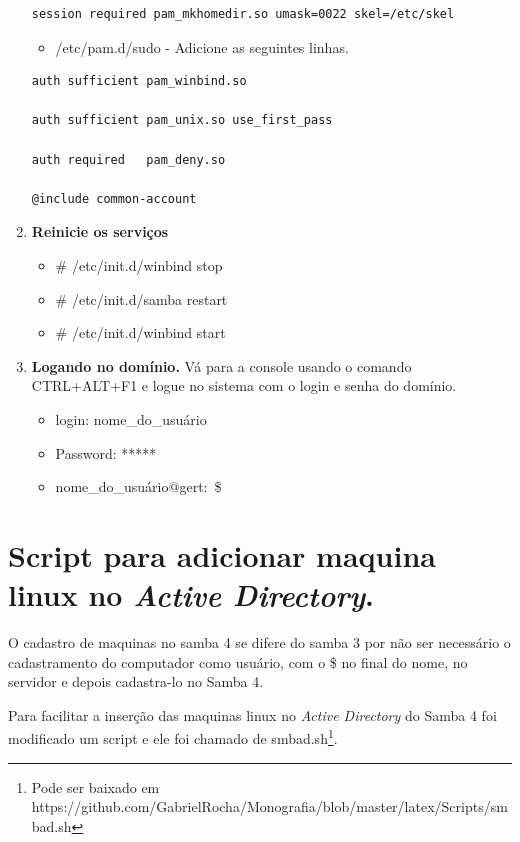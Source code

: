 \begin{enumerate}
\begin{lstlisting}
session required pam_mkhomedir.so umask=0022 skel=/etc/skel
		\end{lstlisting}

		\begin{itemize}
			\item {/etc/pam.d/sudo} - Adicione as seguintes linhas.\\
		\end{itemize}

		\begin{lstlisting}
auth sufficient pam_winbind.so

auth sufficient pam_unix.so use_first_pass

auth required   pam_deny.so

@include common-account
		\end{lstlisting}

	\item \textbf{Reinicie os serviços}
		\begin{itemize}
			\item \# /etc/init.d/winbind stop
			\item \# /etc/init.d/samba restart		
			\item \# /etc/init.d/winbind start
		\end{itemize}

	\item \textbf{Logando no domínio.}
		Vá para a console usando o comando CTRL+ALT+F1 e logue no sistema com o login e senha do domínio.

		\begin{itemize}
			\item {login: nome\_do\_usuário}
			\item {Password: *****}
			\item {nome\_do\_usuário$@$gert:~\$}
		\end{itemize}

\end{enumerate}

\section{Script para adicionar maquina linux no \textit{Active Directory}.}

O cadastro de maquinas no samba 4 se difere do samba 3 por não ser necessário o cadastramento do computador como usuário, com o \$ no final do nome, no servidor e depois cadastra-lo no Samba 4.

Para facilitar a inserção das maquinas linux no \textit{Active Directory} do Samba 4 foi modificado um script e ele foi chamado de smbad.sh\footnote[4]{Pode ser baixado em https://github.com/GabrielRocha/Monografia/blob/master/latex/Scripts/smbad.sh}. 

